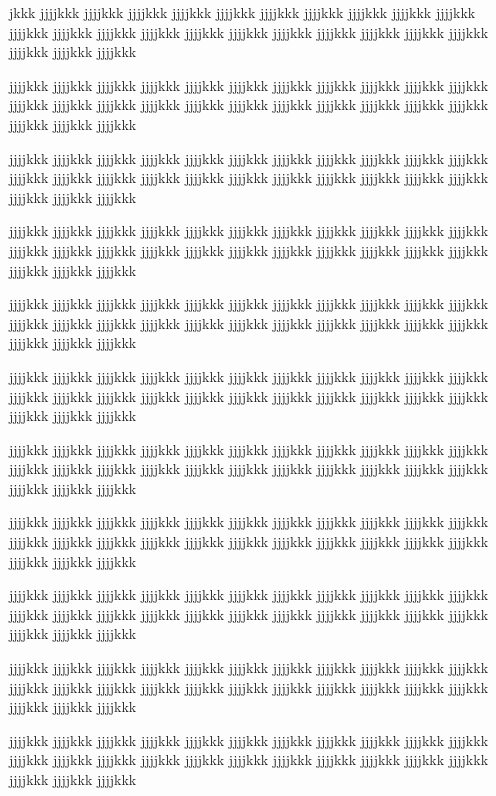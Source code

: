 jkkk jjjjkkk jjjjkkk jjjjkkk jjjjkkk jjjjkkk jjjjkkk jjjjkkk jjjjkkk jjjjkkk jjjjkkk jjjjkkk jjjjkkk jjjjkkk jjjjkkk jjjjkkk jjjjkkk jjjjkkk jjjjkkk jjjjkkk jjjjkkk jjjjkkk jjjjkkk jjjjkkk jjjjkkk

jjjjkkk jjjjkkk jjjjkkk jjjjkkk jjjjkkk jjjjkkk jjjjkkk jjjjkkk jjjjkkk jjjjkkk jjjjkkk jjjjkkk jjjjkkk jjjjkkk jjjjkkk jjjjkkk jjjjkkk jjjjkkk jjjjkkk jjjjkkk jjjjkkk jjjjkkk jjjjkkk jjjjkkk jjjjkkk

jjjjkkk jjjjkkk jjjjkkk jjjjkkk jjjjkkk jjjjkkk jjjjkkk jjjjkkk jjjjkkk jjjjkkk jjjjkkk jjjjkkk jjjjkkk jjjjkkk jjjjkkk jjjjkkk jjjjkkk jjjjkkk jjjjkkk jjjjkkk jjjjkkk jjjjkkk jjjjkkk jjjjkkk jjjjkkk

jjjjkkk jjjjkkk jjjjkkk jjjjkkk jjjjkkk jjjjkkk jjjjkkk jjjjkkk jjjjkkk jjjjkkk jjjjkkk jjjjkkk jjjjkkk jjjjkkk jjjjkkk jjjjkkk jjjjkkk jjjjkkk jjjjkkk jjjjkkk jjjjkkk jjjjkkk jjjjkkk jjjjkkk jjjjkkk

jjjjkkk jjjjkkk jjjjkkk jjjjkkk jjjjkkk jjjjkkk jjjjkkk jjjjkkk jjjjkkk jjjjkkk jjjjkkk jjjjkkk jjjjkkk jjjjkkk jjjjkkk jjjjkkk jjjjkkk jjjjkkk jjjjkkk jjjjkkk jjjjkkk jjjjkkk jjjjkkk jjjjkkk jjjjkkk

jjjjkkk jjjjkkk jjjjkkk jjjjkkk jjjjkkk jjjjkkk jjjjkkk jjjjkkk jjjjkkk jjjjkkk jjjjkkk jjjjkkk jjjjkkk jjjjkkk jjjjkkk jjjjkkk jjjjkkk jjjjkkk jjjjkkk jjjjkkk jjjjkkk jjjjkkk jjjjkkk jjjjkkk jjjjkkk

jjjjkkk jjjjkkk jjjjkkk jjjjkkk jjjjkkk jjjjkkk jjjjkkk jjjjkkk jjjjkkk jjjjkkk jjjjkkk jjjjkkk jjjjkkk jjjjkkk jjjjkkk jjjjkkk jjjjkkk jjjjkkk jjjjkkk jjjjkkk jjjjkkk jjjjkkk jjjjkkk jjjjkkk jjjjkkk

jjjjkkk jjjjkkk jjjjkkk jjjjkkk jjjjkkk jjjjkkk jjjjkkk jjjjkkk jjjjkkk jjjjkkk jjjjkkk jjjjkkk jjjjkkk jjjjkkk jjjjkkk jjjjkkk jjjjkkk jjjjkkk jjjjkkk jjjjkkk jjjjkkk jjjjkkk jjjjkkk jjjjkkk jjjjkkk

jjjjkkk jjjjkkk jjjjkkk jjjjkkk jjjjkkk jjjjkkk jjjjkkk jjjjkkk jjjjkkk jjjjkkk jjjjkkk jjjjkkk jjjjkkk jjjjkkk jjjjkkk jjjjkkk jjjjkkk jjjjkkk jjjjkkk jjjjkkk jjjjkkk jjjjkkk jjjjkkk jjjjkkk jjjjkkk

jjjjkkk jjjjkkk jjjjkkk jjjjkkk jjjjkkk jjjjkkk jjjjkkk jjjjkkk jjjjkkk jjjjkkk jjjjkkk jjjjkkk jjjjkkk jjjjkkk jjjjkkk jjjjkkk jjjjkkk jjjjkkk jjjjkkk jjjjkkk jjjjkkk jjjjkkk jjjjkkk jjjjkkk jjjjkkk

jjjjkkk jjjjkkk jjjjkkk jjjjkkk jjjjkkk jjjjkkk jjjjkkk jjjjkkk jjjjkkk jjjjkkk jjjjkkk jjjjkkk jjjjkkk jjjjkkk jjjjkkk jjjjkkk jjjjkkk jjjjkkk jjjjkkk jjjjkkk jjjjkkk jjjjkkk jjjjkkk jjjjkkk jjjjkkk

